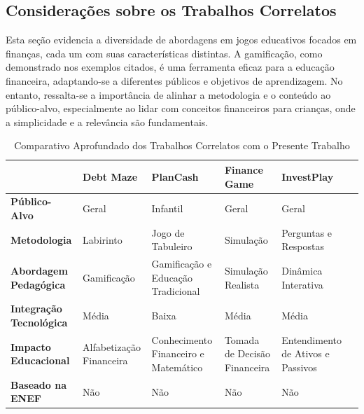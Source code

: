 \subsection{Considerações sobre os Trabalhos Correlatos}
Esta seção evidencia a diversidade de abordagens em jogos educativos focados em finanças, cada um com suas características distintas. A gamificação, como demonstrado nos exemplos citados, é uma ferramenta eficaz para a educação financeira, adaptando-se a diferentes públicos e objetivos de aprendizagem. No entanto, ressalta-se a importância de alinhar a metodologia e o conteúdo ao público-alvo, especialmente ao lidar com conceitos financeiros para crianças, onde a simplicidade e a relevância são fundamentais.

\begin{table}[ht]
	\centering
	\renewcommand{\arraystretch}{1.3}
	\caption{Comparativo Aprofundado dos Trabalhos Correlatos com o Presente Trabalho}
	\label{tab:comparativo-trabalhos}
	\begin{tabular}{| L{2cm} | L{2cm} | L{2cm} | L{2cm} | L{2cm} | L{2cm} |}
		\hline
		\textbf{}                       & \textbf{Debt Maze}       & \textbf{PlanCash}                    & \textbf{Finance Game}        & \textbf{InvestPlay}               \\
		\hline
		\hline
		\textbf{Público-Alvo}           & Geral                    & Infantil                             & Geral                        & Geral                             \\
		\hline
		\textbf{Metodologia}            & Labirinto                & Jogo de Tabuleiro                    & Simulação                    & Perguntas e Respostas             \\
		\hline
		\textbf{Abordagem Pedagógica}   & Gamificação              & Gamificação e Educação Tradicional   & Simulação Realista           & Dinâmica Interativa               \\
		\hline
		\textbf{Integração Tecnológica} & Média                    & Baixa                                & Média                        & Média                             \\
		\hline
		\textbf{Impacto Educacional}    & Alfabetização Financeira & Conhecimento Financeiro e Matemático & Tomada de Decisão Financeira & Entendimento de Ativos e Passivos \\
		\hline
		\textbf{Baseado na ENEF}        & Não                      & Não                                  & Não                          & Não                               \\
		\hline
	\end{tabular}
	\vspace{2mm}
\end{table}
